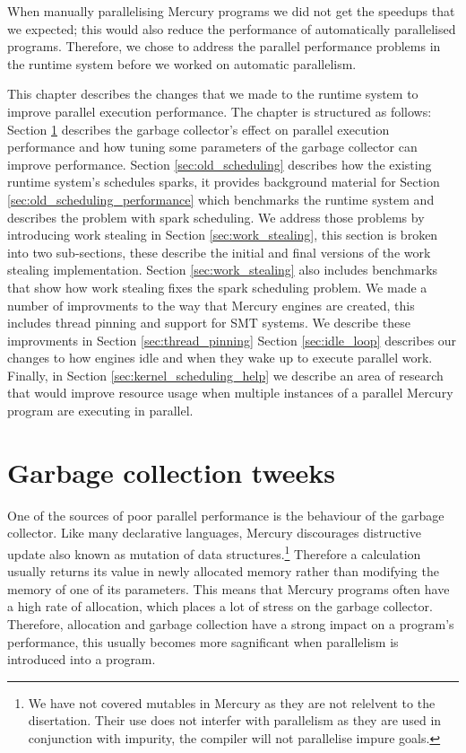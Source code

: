 

When manually parallelising Mercury programs we
did not get the speedups that we expected;
this would also reduce the performance of automatically parallelised
programs.
Therefore,
we chose to address the parallel performance problems
in the runtime system before we worked on automatic parallelism.

This chapter describes the changes that we made to the runtime system to
improve parallel execution performance.
The chapter is structured as follows:
Section \ref{sec:gc} describes the garbage collector's effect on parallel
execution performance and how tuning some parameters of the garbage
collector can improve performance.
Section \ref{sec:old_scheduling} describes how the existing runtime
system's schedules sparks,
it provides background material for Section
\ref{sec:old_scheduling_performance}
which benchmarks the runtime system and describes the problem with spark
scheduling.
We address those problems by introducing work stealing in Section
\ref{sec:work_stealing},
this section is broken into two sub-sections,
these describe the initial and final versions of the work stealing
implementation.
Section \ref{sec:work_stealing} also includes benchmarks that show
how work stealing fixes the spark scheduling problem.
We made a number of improvments to the way that Mercury engines are created,
this includes thread pinning and support for SMT systems.
We describe these improvments in Section \ref{sec:thread_pinning}
Section \ref{sec:idle_loop} describes our changes to how engines idle
and when they wake up to execute parallel work.
Finally, in Section \ref{sec:kernel_scheduling_help}
we describe an area of research that would improve resource usage when
multiple instances of a parallel Mercury program are executing in parallel.

\section{Garbage collection tweeks}
\label{sec:gc}

One of the sources of poor parallel performance is the behaviour of the
garbage collector.
Like many declarative languages,
Mercury discourages distructive update also known as mutation of data
structures.\footnote{
    We have not covered mutables in Mercury as they are not relelvent to the
    disertation.
    Their use does not interfer with parallelism as they are used in
    conjunction with impurity,
    the compiler will not parallelise impure goals.}
Therefore a calculation usually returns its value in newly allocated memory
rather than modifying the memory of one of its parameters.
This means that Mercury programs often have a high rate of allocation,
which places a lot of stress on the garbage collector.
Therefore,
allocation and garbage collection have a strong impact on a program's
performance,
this usually becomes more sagnificant when parallelism is introduced into a
program.

